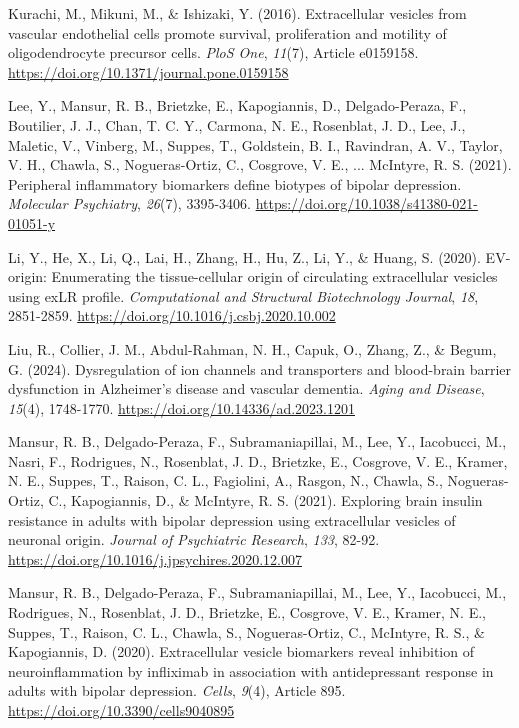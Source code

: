 \documentclass[authordate, empirical, issue]{jote-new-article}
\begin{document}
	Kurachi, M., Mikuni, M., \& Ishizaki, Y. (2016). Extracellular vesicles from vascular endothelial cells promote survival, proliferation and motility of oligodendrocyte precursor cells. \emph{PloS One},\emph{ 11}(7), Article e0159158. \url{https://doi.org/10.1371/journal.pone.0159158}



	Lee, Y., Mansur, R. B., Brietzke, E., Kapogiannis, D., Delgado-Peraza, F., Boutilier, J. J., Chan, T. C. Y., Carmona, N. E., Rosenblat, J. D., Lee, J., Maletic, V., Vinberg, M., Suppes, T., Goldstein, B. I., Ravindran, A. V., Taylor, V. H., Chawla, S., Nogueras-Ortiz, C., Cosgrove, V. E., ... McIntyre, R. S. (2021). Peripheral inflammatory biomarkers define biotypes of bipolar depression. \emph{Molecular Psychiatry},\emph{ 26}(7), 3395-3406. \url{https://doi.org/10.1038/s41380-021-01051-y}



	Li, Y., He, X., Li, Q., Lai, H., Zhang, H., Hu, Z., Li, Y., \& Huang, S. (2020). EV-origin: Enumerating the tissue-cellular origin of circulating extracellular vesicles using exLR profile. \emph{Computational and Structural Biotechnology Journal},\emph{ 18}, 2851-2859. \url{https://doi.org/10.1016/j.csbj.2020.10.002}



	Liu, R., Collier, J. M., Abdul-Rahman, N. H., Capuk, O., Zhang, Z., \& Begum, G. (2024). Dysregulation of ion channels and transporters and blood-brain barrier dysfunction in Alzheimer's disease and vascular dementia. \emph{Aging and Disease},\emph{ 15}(4), 1748-1770. \url{https://doi.org/10.14336/ad.2023.1201}



	Mansur, R. B., Delgado-Peraza, F., Subramaniapillai, M., Lee, Y., Iacobucci, M., Nasri, F., Rodrigues, N., Rosenblat, J. D., Brietzke, E., Cosgrove, V. E., Kramer, N. E., Suppes, T., Raison, C. L., Fagiolini, A., Rasgon, N., Chawla, S., Nogueras-Ortiz, C., Kapogiannis, D., \& McIntyre, R. S. (2021). Exploring brain insulin resistance in adults with bipolar depression using extracellular vesicles of neuronal origin. \emph{Journal of Psychiatric Research},\emph{ 133}, 82-92. \url{https://doi.org/10.1016/j.jpsychires.2020.12.007}



	Mansur, R. B., Delgado-Peraza, F., Subramaniapillai, M., Lee, Y., Iacobucci, M., Rodrigues, N., Rosenblat, J. D., Brietzke, E., Cosgrove, V. E., Kramer, N. E., Suppes, T., Raison, C. L., Chawla, S., Nogueras-Ortiz, C., McIntyre, R. S., \& Kapogiannis, D. (2020). Extracellular vesicle biomarkers reveal inhibition of neuroinflammation by infliximab in association with antidepressant response in adults with bipolar depression. \emph{Cells},\emph{ 9}(4), Article 895. \url{https://doi.org/10.3390/cells9040895}
\end{document}
